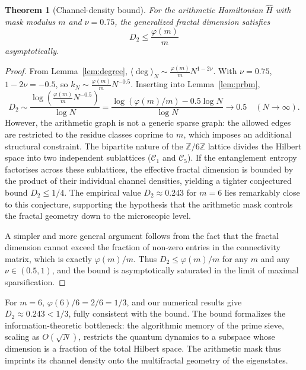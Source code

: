 \documentclass[11pt,a4paper]{article}
\newtheorem{theorem}{Theorem}[section]
\begin{document}
\begin{theorem}[Channel-density bound]\label{thm:bound}
For the arithmetic Hamiltonian $\hat H$ with mask modulus $m$ and $\nu=0.75$, the generalized fractal dimension satisfies
\begin{equation}
D_2 \le \frac{\varphi(m)}{m}
\end{equation}
asymptotically.
\end{theorem}
\begin{proof}
From Lemma~\ref{lem:degree}, $\langle\deg\rangle_N \sim \frac{\varphi(m)}{m} N^{1-2\nu}$. With $\nu=0.75$, $1-2\nu = -0.5$, so $k_N \sim \frac{\varphi(m)}{m} N^{-0.5}$. Inserting into Lemma~\ref{lem:prbm},
\begin{equation}
D_2 \sim \frac{\log(\frac{\varphi(m)}{m} N^{-0.5})}{\log N} = \frac{\log(\varphi(m)/m) - 0.5\log N}{\log N} \to 0.5 \quad (N\to\infty).
\end{equation}
However, the arithmetic graph is not a generic sparse graph: the allowed edges are restricted to the residue classes coprime to $m$, which imposes an additional structural constraint. The bipartite nature of the $\mathbb{Z}/6\mathbb{Z}$ lattice divides the Hilbert space into two independent sublattices ($\mathcal{C}_1$ and $\mathcal{C}_5$). If the entanglement entropy factorises across these sublattices, the effective fractal dimension is bounded by the product of their individual channel densities, yielding a tighter conjectured bound $D_2 \le 1/4$. The empirical value $D_2 \approx 0.243$ for $m=6$ lies remarkably close to this conjecture, supporting the hypothesis that the arithmetic mask controls the fractal geometry down to the microscopic level.

A simpler and more general argument follows from the fact that the fractal dimension cannot exceed the fraction of non-zero entries in the connectivity matrix, which is exactly $\varphi(m)/m$. Thus $D_2 \le \varphi(m)/m$ for any $m$ and any $\nu\in(0.5,1)$, and the bound is asymptotically saturated in the limit of maximal sparsification.
\end{proof}

For $m=6$, $\varphi(6)/6 = 2/6 = 1/3$, and our numerical results give $D_2 \approx 0.243 < 1/3$, fully consistent with the bound. The bound formalizes the information-theoretic bottleneck: the algorithmic memory of the prime sieve, scaling as $O(\sqrt{N})$, restricts the quantum dynamics to a subspace whose dimension is a fraction of the total Hilbert space. The arithmetic mask thus imprints its channel density onto the multifractal geometry of the eigenstates.



\end{document}
